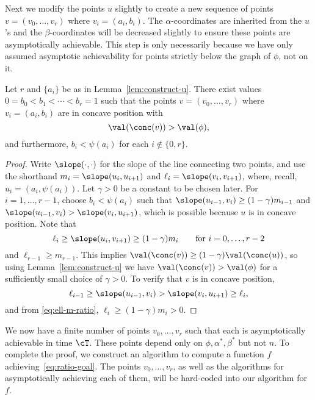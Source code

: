 \documentclass[11pt]{article}
\begin{document}
Next we modify the points $u$ slightly to create a new sequence of points $v = (v_0,\ldots,v_r)$ where $v_i = (a_i,b_i)$. The $\alpha$-coordinates are inherited from the $u$'s and the $\beta$-coordinates will be decreased slightly to ensure these points are asymptotically achievable. This step is only necessarily because we have only assumed asymptotic achievability for points strictly below the graph of $\phi$, not on it.

\begin{lemma}\label{lem:construct-v}
Let $r$ and $\{a_i\}$ be as in Lemma~\ref{lem:construct-u}. There exist values $0 = b_0 < b_1 < \cdots < b_r = 1$ such that the points $v = (v_0,\ldots,v_r)$ where $v_i = (a_i,b_i)$ are in concave position with
\[ \val(\conc(v)) > \val(\phi), \]
and furthermore, $b_i < \psi(a_i)$ for each $i \notin \{0,r\}$.
\end{lemma}

\begin{proof}
Write $\slope(\cdot,\cdot)$ for the slope of the line connecting two points, and use the shorthand $m_i = \slope(u_i,u_{i+1})$ and $\ell_i = \slope(v_i,v_{i+1})$, where, recall, $u_i = (a_i,\psi(a_i))$. Let $\gamma > 0$ be a constant to be chosen later. For $i = 1,\ldots,r-1$, choose $b_i < \psi(a_i)$ such that $\slope(u_{i-1},v_i) \ge (1-\gamma)m_{i-1}$ and $\slope(u_{i-1},v_i) > \slope(v_i,u_{i+1})$, which is possible because $u$ is in concave position. Note that
\begin{equation}\label{eq:ell-m-ratio}
\ell_i \ge \slope(u_i,v_{i+1}) \ge (1-\gamma)m_i \qquad\text{for } i = 0,\ldots,r-2
\end{equation}
and $\ell_{r-1} \ge m_{r-1}$. This implies $\val(\conc(v)) \ge (1-\gamma) \val(\conc(u))$, so using Lemma~\ref{lem:construct-u} we have $\val(\conc(v)) > \val(\phi)$ for a sufficiently small choice of $\gamma > 0$. To verify that $v$ is in concave position,
\[ \ell_{i-1} \ge \slope(u_{i-1},v_i) > \slope(v_i,u_{i+1}) \ge \ell_i, \]
and from \eqref{eq:ell-m-ratio}, $\ell_i \ge (1-\gamma)m_i > 0$.
\end{proof}

We now have a finite number of points $v_0,\ldots,v_r$ such that each is asymptotically achievable in time $\cT$. These points depend only on $\phi,\alpha^*,\beta^*$ but not $n$. To complete the proof, we construct an algorithm to compute a function $f$ achieving~\eqref{eq:ratio-goal}. The points $v_0,\ldots,v_r$, as well as the algorithms for asymptotically achieving each of them, will be hard-coded into our algorithm for $f$.
\end{document}
